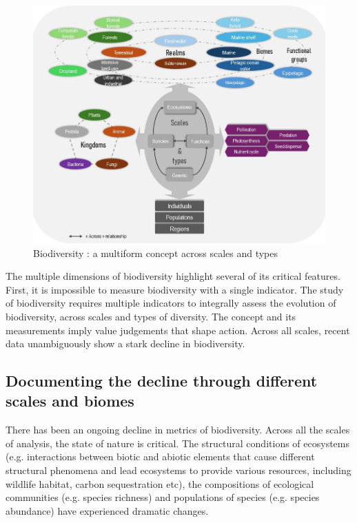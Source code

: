 \begin{figure}
	\centering
	\includegraphics[width =.8\textwidth]{figures/intro/biodiv_illustration.jpg}
	\caption{Biodiversity : a multiform concept across scales and types}
	\label{fig:intro_biod}
\end{figure}

The multiple dimensions of biodiversity highlight several of its critical features. First, it is impossible to measure biodiversity with a single indicator. The study of biodiversity requires multiple indicators to integrally assess the evolution of biodiversity, across scales and types of diversity. The concept and its measurements imply value judgements that shape action. Across all scales, recent data unambiguously show a stark decline in biodiversity. 

\subsection*{Documenting the decline through different scales and biomes}

There has been an ongoing decline in metrics of biodiversity. Across all the scales of analysis, the state of nature is critical. The structural conditions of ecosystems (e.g. interactions between biotic and abiotic elements that cause different structural phenomena and lead ecosystems to provide various resources, including wildlife habitat, carbon sequestration etc), the compositions of ecological communities (e.g. species richness) and populations of species (e.g. species abundance) have experienced dramatic changes. 

